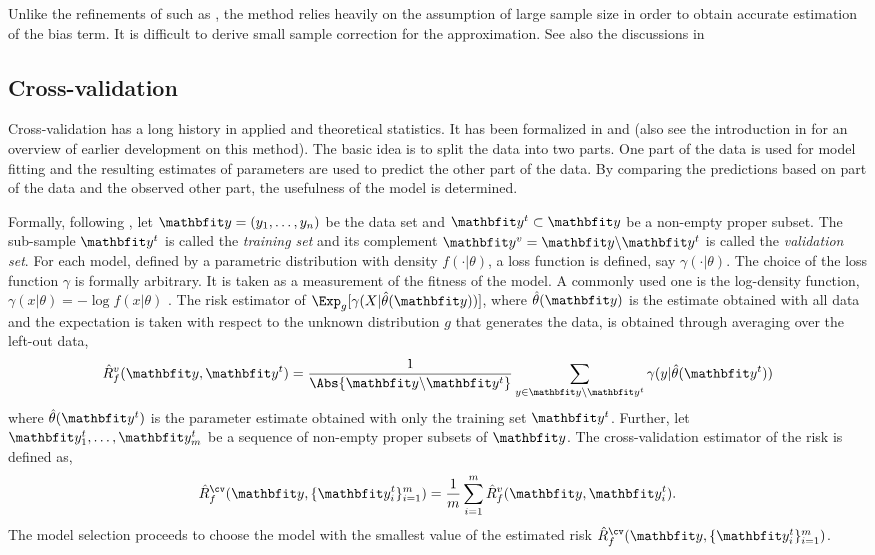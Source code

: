 Unlike the refinements of \aic such as \aicc, the \tic method relies heavily
on the assumption of large sample size in order to obtain accurate estimation
of the bias term. It is difficult to derive small sample correction for the
\tic approximation. See also the discussions in
\cite[][sec.~6.7.8]{Burnham:2002wc}

\subsection{Cross-validation}
\label{sub:Cross-validation}

Cross-validation has a long history in applied and theoretical statistics. It
has been formalized in \cite{Geisser:1975vx} and \cite{Stone:1974vx} (also
see the introduction in \cite{Stone:1974vx} for an overview of earlier
development on this method). The basic idea is to split the data into two
parts. One part of the data is used for model fitting and the resulting
estimates of parameters are used to predict the other part of the data. By
comparing the predictions based on part of the data and the observed other
part, the usefulness of the model is determined.

Formally, following \cite{Geisser:1975vx}, let $\data = (y_1,\dots,y_n)$ be
the data set and $\data^t\subset\data$ be a non-empty proper subset. The
sub-sample $\data^t$ is called the \emph{training set} and its complement
$\data^v = \data\backslash\data^t$ is called the \emph{validation set}. For
each model, defined by a parametric distribution with density
$f(\cdot|\theta)$, a loss function is defined, say $\gamma(\cdot|\theta)$.
The choice of the loss function $\gamma$ is formally arbitrary. It is taken
as a measurement of the fitness of the model. A commonly used one is the
log-density function, $\gamma(x|\theta) = -\log f(x|\theta)$
\cite{Stone:1977vx}. The risk estimator of
$\Exp_g[\gamma(X|\hat\theta(\data))]$, where $\hat\theta(\data)$ is the
estimate obtained with all data and the expectation is taken with respect to
the unknown distribution $g$ that generates the data, is obtained through
averaging over the left-out data,
\begin{equation}
  \hat{R}_f^v(\data,\data^t) = \frac{1}{\Abs{\data\backslash\data^t}}
  \sum_{y\in\data\backslash\data^t}\gamma(y|\hat\theta(\data^t))
\end{equation}
where $\hat\theta(\data^t)$ is the parameter estimate obtained with only the
training set $\data^t$. Further, let $\data_1^t,\dots,\data_m^t$ be a
sequence of non-empty proper subsets of $\data$. The cross-validation
estimator of the risk is defined as,
\begin{equation}
  \hat{R}_f^{\cv}(\data,\{\data_i^t\}_{i=1}^m) =
  \frac{1}{m}\sum_{i=1}^m \hat{R}_f^v(\data,\data_i^t).
\end{equation}
The model selection proceeds to choose the model with the smallest value of the estimated risk $\hat{R}_f^{\cv}(\data,\{\data_i^t\}_{i=1}^m)$.

